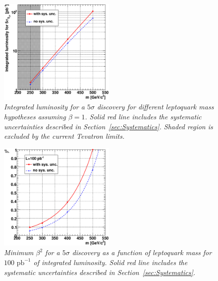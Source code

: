 \begin{figure}[h!]
 \centering
  \includegraphics[width=0.5\textwidth]{plots/cmsPotential/L5sigma_vs_m_log.eps}
 \caption{\small \sl Integrated luminosity
for a $5\sigma$ discovery for different leptoquark mass hypotheses assuming $\beta=1$. Solid red line includes the systematic uncertainties described in 
Section~\ref{sec:Systematics}. Shaded region is excluded by the current Tevatron limits.\label{fig:discovery}}
\end{figure}
\begin{figure}[h!]
 \centering
  \includegraphics[width=0.5\textwidth]{plots/cmsPotential/beta2_vs_m.eps}
 \caption{\small \sl Minimum $\beta^2$ for
a $5\sigma$ discovery as a function of leptoquark mass for $100\text{ pb}^{-1}$ of integrated luminosity. Solid red line includes the systematic
uncertainties described in Section~\ref{sec:Systematics}.\label{fig:discovery_beta}}
\end{figure}


